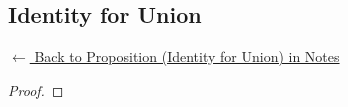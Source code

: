 
\subsection*{Identity for Union}
\label{prf:identity-union}

\begin{remark*}[Return]
\hyperref[prop:identity-union]{$\leftarrow$ Back to Proposition (Identity for Union) in Notes}
\end{remark*}

\begin{proof}
\end{proof}

\begin{remark*}

\end{remark*}

\begin{remark*}[Dependencies]

\FlashUses{}
\end{remark*}
